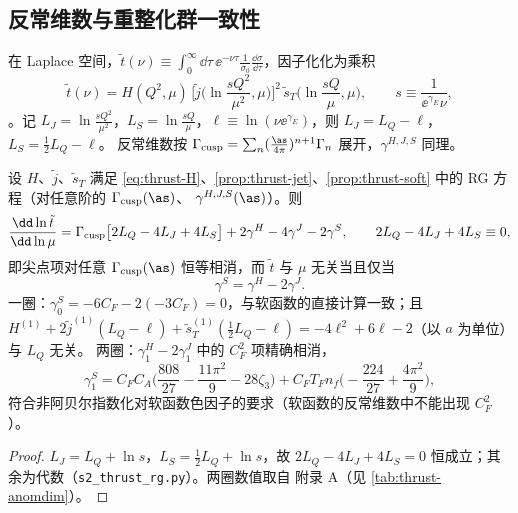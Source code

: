 \subsection{反常维数与重整化群一致性}

在 Laplace 空间，$\tilde t(\nu)\equiv\int_0^\infty\dd\tau\,\ee^{-\nu\tau}\frac{1}{\sigma_0}\frac{\dd\sigma}{\dd\tau}$，因子化化为乘积
\begin{equation}\label{eq:thrust-laplace}
\tilde t(\nu)=H(Q^2,\mu)\,\Big[\tilde j\Big(\ln\frac{sQ^2}{\mu^2},\mu\Big)\Big]^2\,\tilde s_T\Big(\ln\frac{sQ}{\mu},\mu\Big),\qquad s\equiv\frac{1}{\ee^{\gamma_E}\nu},
\end{equation}
\cite{BecherSchwartz2008}。记 $L_J=\ln\frac{sQ^2}{\mu^2}$，$L_S=\ln\frac{sQ}{\mu}$，$\ell\equiv\ln(\nu\ee^{\gamma_E})$，则 $L_J=L_Q-\ell$，$L_S=\frac12L_Q-\ell$。
反常维数按 $\Gamma_{\rm cusp}=\sum_n(\frac{\as}{4\pi})^{n+1}\Gamma_n$ 展开，$\gamma^{H,J,S}$ 同理。

\begin{proposition}[RG 一致性]\tagR\label{prop:thrust-RG}
设 $H$、$\tilde j$、$\tilde s_T$ 满足 \cref{eq:thrust-H}、\cref{prop:thrust-jet}、\cref{prop:thrust-soft} 中的 RG 方程（对任意阶的 $\Gamma_{\rm cusp}(\as)$、
$\gamma^{H,J,S}(\as)$）。则
\begin{equation}\label{eq:thrust-RGsum}
\frac{\dd\ln\tilde t}{\dd\ln\mu}=\Gamma_{\rm cusp}\big[2L_Q-4L_J+4L_S\big]+2\gamma^H-4\gamma^J-2\gamma^S,\qquad 2L_Q-4L_J+4L_S\equiv0,
\end{equation}
即尖点项对任意 $\Gamma_{\rm cusp}(\as)$ 恒等相消，而 $\tilde t$ 与 $\mu$ 无关当且仅当
\begin{equation}\label{eq:thrust-gS}
\gamma^S=\gamma^H-2\gamma^J .
\end{equation}
一圈：$\gamma^S_0=-6C_F-2(-3C_F)=0$，与软函数的直接计算一致；且
$H^{(1)}+2\tilde j^{(1)}(L_Q-\ell)+\tilde s^{(1)}_T(\frac12L_Q-\ell)=-4\ell^2+6\ell-2$（以 $a$ 为单位）与 $L_Q$ 无关。
两圈：$\gamma_1^H-2\gamma_1^J$ 中的 $C_F^2$ 项精确相消，
\begin{equation}\label{eq:thrust-gS1}
\gamma^S_1=C_FC_A\Big(\frac{808}{27}-\frac{11\pi^2}{9}-28\zeta_3\Big)+C_FT_Fn_f\Big(-\frac{224}{27}+\frac{4\pi^2}{9}\Big),
\end{equation}
符合非阿贝尔指数化对软函数色因子的要求（软函数的反常维数中不能出现 $C_F^2$）。
\end{proposition}

\begin{proof}
$L_J=L_Q+\ln s$，$L_S=\frac12L_Q+\ln s$，故 $2L_Q-4L_J+4L_S=0$ 恒成立；其余为代数（\texttt{s2\_\allowbreak thrust\_\allowbreak rg.py}）。两圈数值取自
\cite{BecherSchwartz2008} 附录 A（见 \cref{tab:thrust-anomdim}）。
\end{proof}


